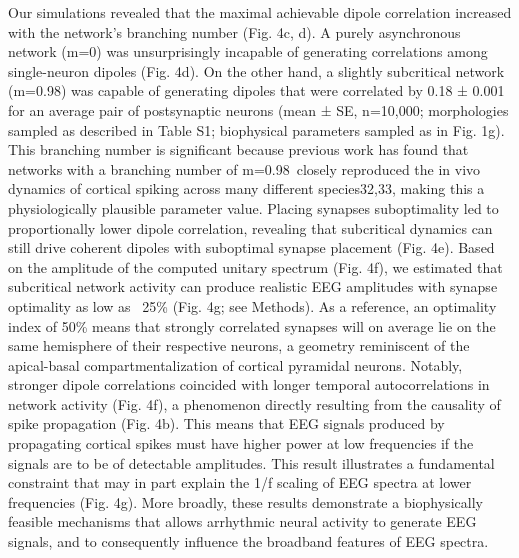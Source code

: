 Our simulations revealed that the maximal achievable dipole correlation increased with the network’s branching number (Fig. 4c, d). A purely asynchronous network (m=0) was unsurprisingly incapable of generating correlations among single-neuron dipoles (Fig. 4d). On the other hand, a slightly subcritical network (m=0.98) was capable of generating dipoles that were correlated by 0.18 ± 0.001 for an average pair of postsynaptic neurons (mean ± SE, n=10,000; morphologies sampled as described in Table S1; biophysical parameters sampled as in Fig. 1g). This branching number is significant because previous work has found that networks with a branching number of m=0.98\ closely reproduced the in vivo dynamics of cortical spiking across many different species32,33, making this a physiologically plausible parameter value. Placing synapses suboptimality led to proportionally lower dipole correlation, revealing that subcritical dynamics can still drive coherent dipoles with suboptimal synapse placement (Fig. 4e). Based on the amplitude of the computed unitary spectrum (Fig. 4f), we estimated that subcritical network activity can produce realistic EEG amplitudes with synapse optimality as low as ~25\% (Fig. 4g; see Methods). As a reference, an optimality index of 50\% means that strongly correlated synapses will on average lie on the same hemisphere of their respective neurons, a geometry reminiscent of the apical-basal compartmentalization of cortical pyramidal neurons. 
Notably, stronger dipole correlations coincided with longer temporal autocorrelations in network activity (Fig. 4f), a phenomenon directly resulting from the causality of spike propagation (Fig. 4b). This means that EEG signals produced by propagating cortical spikes must have higher power at low frequencies if the signals are to be of detectable amplitudes. This result illustrates a fundamental constraint that may in part explain the 1/f scaling of EEG spectra at lower frequencies (Fig. 4g). More broadly, these results demonstrate a biophysically feasible mechanisms that allows arrhythmic neural activity to generate EEG signals, and to consequently influence the broadband features of EEG spectra.

